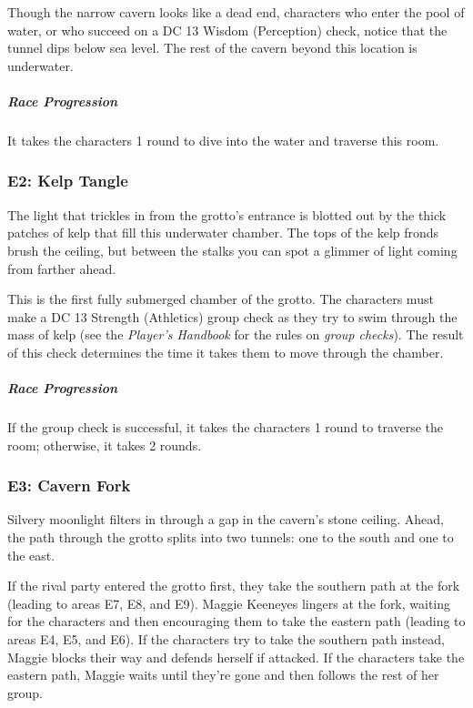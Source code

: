 \documentclass[10pt,a4paper,twoside,bg=print,twocolumn,openany,nodeprecatedcode]{dndbook}
\begin{document}
Though the narrow cavern looks like a dead end, characters who enter the pool of water, or who succeed on a DC 13 Wisdom (Perception) check, notice that the tunnel dips below sea level. The rest of the cavern beyond this location is underwater.

\subparagraph{Race Progression}
It takes the characters 1 round to dive into the water and traverse this room.

\subsubsection{E2: Kelp Tangle}
\begin{DndReadAloud}{}
The light that trickles in from the grotto's entrance is blotted out by the thick patches of kelp that fill this underwater chamber. The tops of the kelp fronds brush the ceiling, but between the stalks you can spot a glimmer of light coming from farther ahead.

\end{DndReadAloud}

This is the first fully submerged chamber of the grotto. The characters must make a DC 13 Strength (Athletics) group check as they try to swim through the mass of kelp (see the \textit{Player's Handbook} for the rules on \textit{group checks}). The result of this check determines the time it takes them to move through the chamber.

\subparagraph{Race Progression}
If the group check is successful, it takes the characters 1 round to traverse the room; otherwise, it takes 2 rounds.

\subsubsection{E3: Cavern Fork}
\begin{DndReadAloud}{}
Silvery moonlight filters in through a gap in the cavern's stone ceiling. Ahead, the path through the grotto splits into two tunnels: one to the south and one to the east.

\end{DndReadAloud}

If the rival party entered the grotto first, they take the southern path at the fork (leading to areas E7, E8, and E9). Maggie Keeneyes lingers at the fork, waiting for the characters and then encouraging them to take the eastern path (leading to areas E4, E5, and E6). If the characters try to take the southern path instead, Maggie blocks their way and defends herself if attacked. If the characters take the eastern path, Maggie waits until they're gone and then follows the rest of her group.
\end{document}
